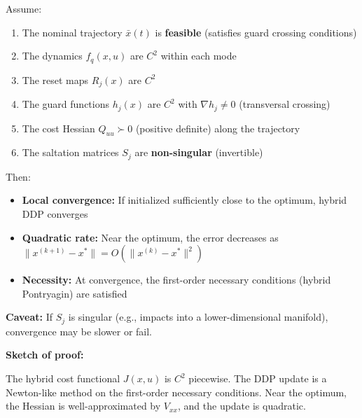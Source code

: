 \documentclass[
  letterpaper,
  DIV=11,
  numbers=noendperiod]{scrartcl}
\providecommand{\tightlist}{%
  \setlength{\itemsep}{0pt}\setlength{\parskip}{0pt}}\usepackage{longtable,booktabs,array}
\begin{document}
\begin{tcolorbox}[enhanced jigsaw, coltitle=black, titlerule=0mm, toprule=.15mm, opacitybacktitle=0.6, left=2mm, opacityback=0, rightrule=.15mm, leftrule=.75mm, breakable, colframe=quarto-callout-important-color-frame, bottomtitle=1mm, toptitle=1mm, arc=.35mm, title=\textcolor{quarto-callout-important-color}{\faExclamation}\hspace{0.5em}{Theorem: Convergence of Hybrid DDP}, bottomrule=.15mm, colback=white, colbacktitle=quarto-callout-important-color!10!white]

Assume:

\begin{enumerate}
\def\labelenumi{\arabic{enumi}.}
\tightlist
\item
  The nominal trajectory \(\bar{x}(t)\) is \textbf{feasible} (satisfies
  guard crossing conditions)
\item
  The dynamics \(f_q(x, u)\) are \(C^2\) within each mode
\item
  The reset maps \(R_j(x)\) are \(C^2\)
\item
  The guard functions \(h_j(x)\) are \(C^2\) with \(\nabla h_j \neq 0\)
  (transversal crossing)
\item
  The cost Hessian \(Q_{uu} \succ 0\) (positive definite) along the
  trajectory
\item
  The saltation matrices \(S_j\) are \textbf{non-singular} (invertible)
\end{enumerate}

Then:

\begin{itemize}
\tightlist
\item
  \textbf{Local convergence:} If initialized sufficiently close to the
  optimum, hybrid DDP converges
\item
  \textbf{Quadratic rate:} Near the optimum, the error decreases as
  \(\|x^{(k+1)} - x^*\| = O(\|x^{(k)} - x^*\|^2)\)
\item
  \textbf{Necessity:} At convergence, the first-order necessary
  conditions (hybrid Pontryagin) are satisfied
\end{itemize}

\textbf{Caveat:} If \(S_j\) is singular (e.g., impacts into a
lower-dimensional manifold), convergence may be slower or fail.

\end{tcolorbox}

\textbf{Sketch of proof:}

The hybrid cost functional \(J(x, u)\) is \(C^2\) piecewise. The DDP
update is a Newton-like method on the first-order necessary conditions.
Near the optimum, the Hessian is well-approximated by \(V_{xx}\), and
the update is quadratic.
\end{document}
